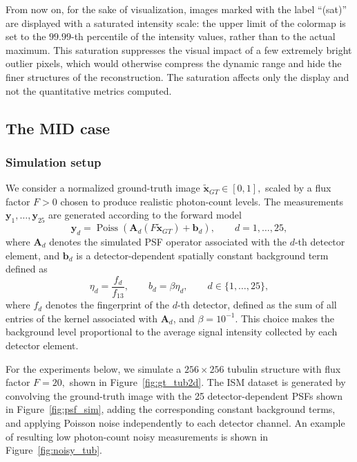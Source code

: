 \documentclass[letterpaper]{article}
\begin{document}
From now on, for the sake of visualization, images marked with the label ``(sat)'' are displayed with a saturated intensity scale: the upper limit of the colormap is set to the $99.99$-th percentile of the intensity values, rather than to the actual maximum. This saturation suppresses the visual impact of a few extremely bright outlier pixels, which would otherwise compress the dynamic range and hide the finer structures of the reconstruction. The saturation affects only the display and not the quantitative metrics computed.

\subsection{The MID case}

\subsubsection{Simulation setup}
We consider a normalized ground-truth image
$
\tilde{\mathbf x}_{GT}\in[0,1],
$
scaled by a flux factor $F>0$ chosen to produce realistic photon-count levels. The measurements
$
\mathbf y_1,\dots,\mathbf y_{25}
$
are generated according to the forward model
\begin{equation}
    \mathbf y_d
    =
    \operatorname{Poiss}
    \left(
    \mathbf A_d(F\tilde{\mathbf x}_{GT})
    +
    \mathbf b_d
    \right),
    \qquad
    d=1,\dots,25,
\end{equation}
where $\mathbf A_d$ denotes the simulated PSF operator associated with the $d$-th detector element, and $\mathbf b_d$ is a detector-dependent spatially constant background term defined as
\begin{equation}
\label{eq:bg_index}
    \eta_d
    =
    \frac{f_d}{f_{13}},
    \qquad
    b_d
    =
    \beta\eta_d,
    \qquad
    d\in\{1,\dots,25\},
\end{equation}
where $f_d$ denotes the fingerprint of the $d$-th detector, defined as the sum of all entries of the kernel associated with $\mathbf A_d$, and $\beta=10^{-1}$. This choice makes the background level proportional to the average signal intensity collected by each detector element.

For the experiments below, we simulate a $256\times256$ tubulin structure with flux factor
$
F=20,
$
shown in Figure~\ref{fig:gt_tub2d}. The ISM dataset is generated by convolving the ground-truth image with the 25 detector-dependent PSFs shown in Figure~\ref{fig:psf_sim}, adding the corresponding constant background terms, and applying Poisson noise independently to each detector channel. An example of resulting low photon-count noisy measurements is shown in Figure~\ref{fig:noisy_tub}.
\end{document}
